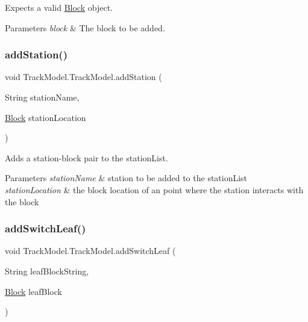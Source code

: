 Expects a valid \hyperlink{classTrackModel_1_1Block}{Block} object.


\begin{DoxyParams}{Parameters}
{\em block} & The block to be added. \\
\hline
\end{DoxyParams}
\mbox{\label{classTrackModel_1_1TrackModel_a4c6034df7cc2dc75d516b49b2836d30b}} 
\subsubsection{\texorpdfstring{add\+Station()}{addStation()}}
{\footnotesize\ttfamily void Track\+Model.\+Track\+Model.\+add\+Station (\begin{DoxyParamCaption}\item[{String}]{station\+Name,  }\item[{\hyperlink{classTrackModel_1_1Block}{Block}}]{station\+Location }\end{DoxyParamCaption})\hspace{0.3cm}{\ttfamily [private]}}



Adds a station-\/block pair to the station\+List. 


\begin{DoxyParams}{Parameters}
{\em station\+Name} & station to be added to the station\+List \\
\hline
{\em station\+Location} & the block location of an point where the station interacts with the block \\
\hline
\end{DoxyParams}
\mbox{\label{classTrackModel_1_1TrackModel_acf1825e32611df62702740caddbb3698}} 
\subsubsection{\texorpdfstring{add\+Switch\+Leaf()}{addSwitchLeaf()}}
{\footnotesize\ttfamily void Track\+Model.\+Track\+Model.\+add\+Switch\+Leaf (\begin{DoxyParamCaption}\item[{String}]{leaf\+Block\+String,  }\item[{\hyperlink{classTrackModel_1_1Block}{Block}}]{leaf\+Block }\end{DoxyParamCaption})\hspace{0.3cm}{\ttfamily [private]}}

